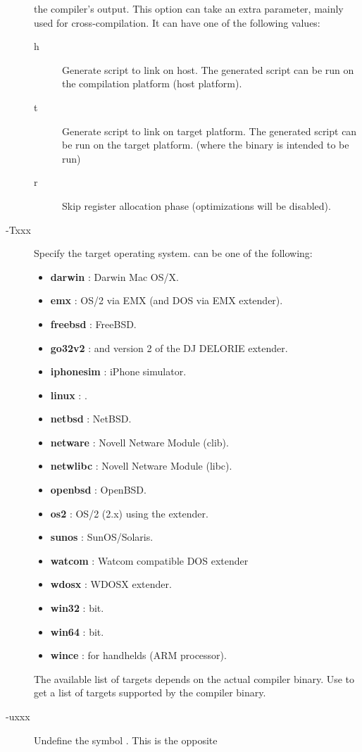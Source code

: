 \begin{description}
the compiler's output. This option can take an extra parameter, mainly
used for cross-compilation. It can have one of the following values:
\begin{description}
\item[h] Generate script to link on host. The generated script can be run on
the compilation platform (host platform).
\item[t] Generate script to link on target platform. The generated script
can be run on the target platform. (where the binary is intended to be run)
\item[r] Skip register allocation phase (optimizations will be disabled).
\end{description}
\item[-Txxx]  Specify the target operating system.  can be one of
the following:
\begin{itemize}
\item \textbf{darwin} : Darwin Mac OS/X.
\item \textbf{emx} : OS/2 via EMX (and DOS via EMX extender).
\item \textbf{freebsd} : FreeBSD.
\item \textbf{go32v2} : \dos and version 2 of the DJ DELORIE extender.
\item \textbf{iphonesim} : iPhone simulator.
\item \textbf{linux} : \linux.
\item \textbf{netbsd} : NetBSD.
\item \textbf{netware} : Novell Netware Module (clib).
\item \textbf{netwlibc} : Novell Netware Module (libc).
\item \textbf{openbsd} : OpenBSD.
\item \textbf{os2} : OS/2 (2.x) using the  extender.
\item \textbf{sunos} : SunOS/Solaris.
\item \textbf{watcom} : Watcom compatible DOS extender
\item \textbf{wdosx} : WDOSX extender.
\item \textbf{win32} :  bit.
\item \textbf{win64} :  bit.
\item \textbf{wince} : \windows for handhelds (ARM processor).
\end{itemize}
The available list of targets depends on the actual compiler binary.
Use  to get a list of targets supported by the compiler binary.
\item [-uxxx]  Undefine the symbol . This is the opposite

\end{description}
